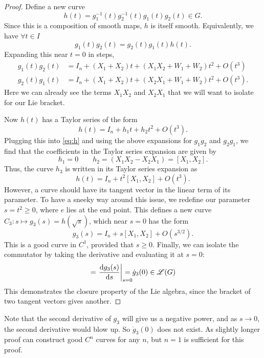 \begin{proof}
  Define a new curve
  \begin{equation}
    h(t) = g_1^{-1}(t) g_2^{-1}(t) g_1(t) g_2(t) \in G.
  \end{equation}
  Since this is a composition of smooth maps, $h$ is itself smooth.
  Equivalently, we have $\forall t \in I$
  \begin{equation}
    \label{eq:h}
    g_1(t)g_2(t) = g_2(t) g_1(t) h(t).
  \end{equation}
  Expanding this near $t=0$ in steps,
  \begin{align}
    g_1(t) g_2(t) &= I_n + (X_1 + X_2)t + (X_1 X_2 + W_1 + W_2) t^2 + O(t^3) \\
    g_2(t) g_1(t) &= I_n + (X_1 + X_2)t + (X_2 X_1 + W_1 + W_2) t^2 + O(t^3).
  \end{align}
  Here we can already see the terms $X_1 X_2$ and $X_2 X_1$ that we will want to isolate for our Lie bracket.

  Now $h(t)$ has a Taylor series of the form
  \begin{equation}
    h(t) = I_n + h_1 t + h_2 t^2 + O(t^3).
  \end{equation}
  Plugging this into \eqref{eq:h} and using the above expansions for $g_1 g_2$ and $g_2 g_1$, we find that the coefficients in the Taylor series expansion are given by
  \begin{equation}
    h_1 = 0 \qquad h_2 = (X_1 X_2 - X_2 X_1) = [X_1, X_2].
  \end{equation}
  Thus, the curve $h_3$ is written in its Taylor series expansion as
  \begin{equation}
    h(t) = I_n + t^2 [X_1, X_2] + O(t^3).
  \end{equation}
  However, a curve should have its tangent vector in the linear term of its parameter.
  To have a sneeky way around this issue, we redefine our parameter $s = t^2 \geq 0$, where $e$ lies at the end point.
  This defines a new curve $C_3: s \mapsto g_3(s) = h(\sqrt{s})$, which near $s = 0$ has the form
  \begin{equation}
    g_3(s) = I_n + s[X_1, X_2] + O(s^{3/2}).
  \end{equation}
  This is a good curve in $C^1$, provided that $s \geq 0$. 
  Finally, we can isolate the commutator by taking the derivative and evaluating it at $s = 0$:
  \begin{equation}
    [X_1, X_2] = \left.\dv{g_3(s)}{s}\right\rvert_{\mathrlap{s = 0}} = \dot g_3(0) \in \mathscr{L}(G)
  \end{equation}
  This demonstrates the closure property of the Lie algebra, since the bracket of two tangent vectors gives another.
\end{proof}
Note that the second derivative of $g_3$ will give us a negative power, and as $s \to 0$, the second derivative would blow up. So $\ddot g_3(0)$ does not exist. As slightly longer proof can construct good $C^n$ curves for any $n$, but $n = 1$ is sufficient for this proof.
